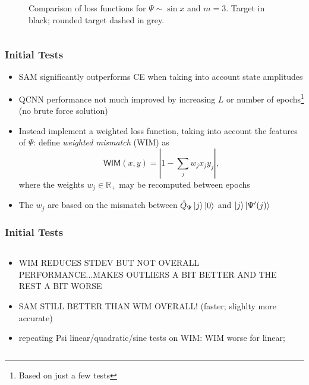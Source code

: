 \documentclass{beamer}
\begin{document}
\begin{frame}
\begin{columns}
\begin{column}{0.5\textwidth}
\begin{figure}[h]
\caption{Comparison of loss functions for $\Psi \sim \sin x$ and $m=3$. Target in black; rounded target dashed in grey.}
\end{figure}
\end{column}
\end{columns}
\end{frame}

\begin{frame}
\frametitle{Initial Tests}
\begin{itemize}
\item \alert{SAM} significantly \alert{outperforms CE} when taking into account state amplitudes 
\item QCNN performance not much improved by increasing $L$ or number of epochs\footnote{Based on just a few tests} (\alert{no brute force solution})
\item Instead implement a \alert{weighted loss function}, taking into account the features of $\Psi$: define \emph{weighted mismatch} (\alert{WIM}) as 
\begin{equation}
\mathsf{WIM}(x,y) =  \left\vert 1 - \sum_j w_j x_j y_j \right \vert, 
\end{equation}
where the weights $w_j \in \mathbb{R}_{+}$ may be recomputed between epochs
\item The $w_j$ are based on the mismatch between $\hat{Q}_\Psi \ket{j} \ket{0}$ and $\ket{j}\ket{\Psi'(j)}$
\end{itemize}
\end{frame}

\begin{frame}
\frametitle{Initial Tests}
\begin{columns}
\begin{column}{0.5\textwidth}
\begin{itemize}
\item WIM REDUCES STDEV BUT NOT OVERALL PERFORMANCE...MAKES OUTLIERS A BIT BETTER AND THE REST A BIT WORSE 
\item SAM STILL BETTER THAN WIM OVERALL! (faster; slighlty more accurate)
\item repeating Psi linear/quadratic/sine tests on WIM: WIM worse for linear; 
\end{itemize}
\end{column}
\begin{column}{0.5\textwidth}

\end{column}
\end{columns}
\end{frame}
\end{document}
